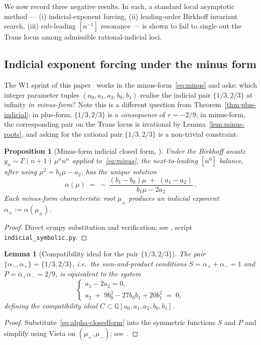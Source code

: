 \documentclass[11pt]{amsart}
\newtheorem{proposition}[theorem]{Proposition}
\newtheorem{lemma}[theorem]{Lemma}
\theoremstyle{definition}
\theoremstyle{remark}
\newcommand{\Q}{\mathbb{Q}}
\begin{document}
We now record three negative results.  In each, a standard local
asymptotic method --- (i) indicial-exponent forcing, (ii) leading-order
Birkhoff invariant search, (iii) sub-leading $[n^{-1}]$ resonance ---
is shown to fail to single out the Trans locus among admissible
rational-indicial loci.

\subsection{Indicial exponent forcing under the minus form}
\label{sec:indicial}

The W1 sprint of this paper~\cite{SprintW1Report} works in the
minus-form~\eqref{eq:minus} and asks: which integer parameter tuples
$(a_0,a_1,a_2,b_0,b_1)$ realise the indicial pair $\{1/3,2/3\}$ at
infinity \emph{in minus-form}?  Note this is a different question
from Theorem~\ref{thm:plus-indicial}: in plus-form, $\{1/3,2/3\}$ is
a \emph{consequence} of $r=-2/9$; in minus-form, the corresponding
pair on the Trans locus is irrational by Lemma~\ref{lem:minus-roots},
and asking for the rational pair $\{1/3,2/3\}$ is a non-trivial
constraint.

\begin{proposition}[Minus-form indicial closed form,
\cite{SprintW1Report}]
\label{prop:minus-indicial}
Under the Birkhoff ansatz $y_n \sim \Gamma(n+1)\,\mu^n n^\alpha$
applied to~\eqref{eq:minus}, the next-to-leading $[n^0]$ balance,
after using $\mu^2 = b_1\mu - a_2$, has the unique solution
\begin{equation}\label{eq:alpha-closedform}
  \alpha(\mu) \;=\; -\,\frac{(b_1 - b_0)\mu \;+\; (a_1 - a_2)}%
                            {b_1\mu - 2 a_2}\,.
\end{equation}
Each minus-form characteristic root $\mu_\pm$ produces an indicial
exponent $\alpha_\pm := \alpha(\mu_\pm)$.
\end{proposition}
\begin{proof}
Direct sympy substitution and verification; see
\cite[]{SprintW1Report}, script
\texttt{indicial\_symbolic.py}.
\end{proof}

\begin{lemma}[Compatibility ideal for the pair $\{1/3,2/3\}$]
\label{lem:compat-ideal}
The pair $\{\alpha_-,\alpha_+\} = \{1/3,2/3\}$, i.e.\ the
sum-and-product conditions $S = \alpha_++\alpha_- = 1$ and $P =
\alpha_+\alpha_- = 2/9$, is equivalent to the system
\[
  \begin{cases}
    a_1 - 2 a_2 = 0,\\
    a_2 \;+\; 9 b_0^2 - 27 b_0 b_1 + 20 b_1^2 \;=\; 0,
  \end{cases}
\]
defining the compatibility ideal $C \subset
\Q[a_0,a_1,a_2,b_0,b_1]$.
\end{lemma}
\begin{proof}
Substitute~\eqref{eq:alpha-closedform} into the symmetric functions
$S$ and $P$ and simplify using Vieta on $(\mu_+,\mu_-)$;
see~\cite[]{SprintW1Report}.
\end{proof}
\end{document}
